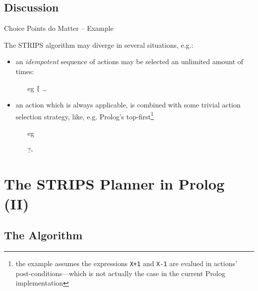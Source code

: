 \documentclass[presentation]{beamer}\mode<presentation>{\usetheme{AMSBolognaFC}}
\begin{document}
\subsection{Discussion}

\begin{frame}[c]{Choice Points do Matter -- Example}

The STRIPS algorithm may diverge in several situations, e.g.:
%
\vfill
%
\begin{itemize}
    \item an \alert{\emph{idempotent}} sequence of actions may be selected an unlimited amount of times:
    \begin{itemize}
        \item[eg] \texttt{[} \ldots
    \end{itemize}

    \vfill

    \item an action which is always applicable, is combined with some trivial action selection strategy, like, e.g. Prolog's top-first\footnote{the example assumes the expressions \texttt{X+1} and \texttt{X-1} are \alert{evalued} in actions' post-conditions---which is not actually the case in the current Prolog implementation}
    \begin{itemize}\scriptsize
        \item[eg] 
        \\

        \item[]

        \item[?-] 
    \end{itemize}
\end{itemize}

\end{frame}


\section{The STRIPS Planner in Prolog (II)}

\subsection{The Algorithm}
\end{document}
